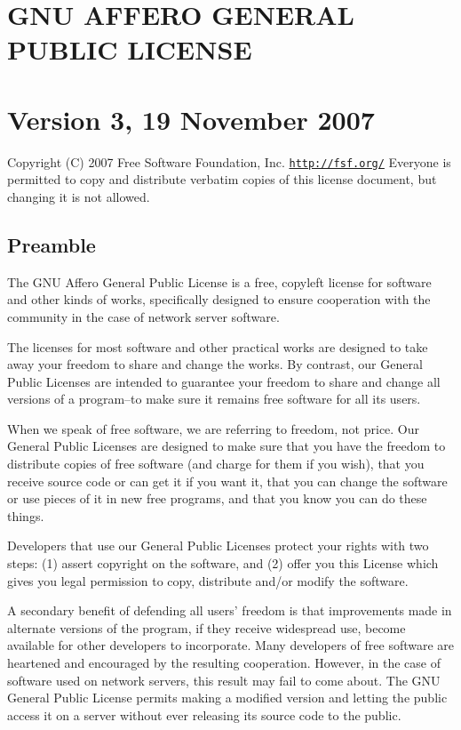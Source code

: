 \hypertarget{index_STING_A}{}\section{G\-N\-U A\-F\-F\-E\-R\-O G\-E\-N\-E\-R\-A\-L P\-U\-B\-L\-I\-C L\-I\-C\-E\-N\-S\-E}\label{index_STING_A}
\hypertarget{index_STING_B}{}\section{Version 3, 19 November 2007}\label{index_STING_B}
Copyright (C) 2007 Free Software Foundation, Inc. \href{http://fsf.org/}{\tt http\-://fsf.\-org/} Everyone is permitted to copy and distribute verbatim copies of this license document, but changing it is not allowed.\hypertarget{index_Preamble}{}\subsection{Preamble}\label{index_Preamble}
The G\-N\-U Affero General Public License is a free, copyleft license for software and other kinds of works, specifically designed to ensure cooperation with the community in the case of network server software.

The licenses for most software and other practical works are designed to take away your freedom to share and change the works. By contrast, our General Public Licenses are intended to guarantee your freedom to share and change all versions of a program--to make sure it remains free software for all its users.

When we speak of free software, we are referring to freedom, not price. Our General Public Licenses are designed to make sure that you have the freedom to distribute copies of free software (and charge for them if you wish), that you receive source code or can get it if you want it, that you can change the software or use pieces of it in new free programs, and that you know you can do these things.

Developers that use our General Public Licenses protect your rights with two steps\-: (1) assert copyright on the software, and (2) offer you this License which gives you legal permission to copy, distribute and/or modify the software.

A secondary benefit of defending all users' freedom is that improvements made in alternate versions of the program, if they receive widespread use, become available for other developers to incorporate. Many developers of free software are heartened and encouraged by the resulting cooperation. However, in the case of software used on network servers, this result may fail to come about. The G\-N\-U General Public License permits making a modified version and letting the public access it on a server without ever releasing its source code to the public.

